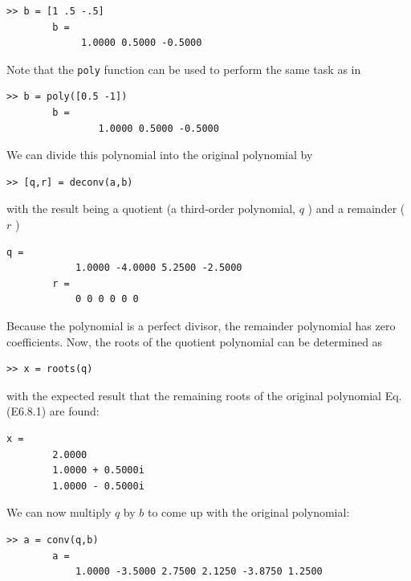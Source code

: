 \documentclass[../main.tex]{subfiles}
\begin{document}
\begin{example}
    \begin{lstlisting}[numbers=none,frame=none]
        >> b = [1 .5 -.5]
        b =
             1.0000 0.5000 -0.5000
	\end{lstlisting}


    \noindent Note that the \texttt{poly} function can be used to perform the same task as in

    \begin{lstlisting}[numbers=none,frame=none]
        >> b = poly([0.5 -1])
        b =
                1.0000 0.5000 -0.5000
	\end{lstlisting}

    \noindent We can divide this polynomial into the original polynomial by

    \begin{lstlisting}[numbers=none,frame=none]
            >> [q,r] = deconv(a,b)
	\end{lstlisting}

    \noindent with the result being a quotient (a third-order polynomial, $q$ ) and a remainder ( $r$ )

    \begin{lstlisting}[numbers=none,frame=none]
        q =
            1.0000 -4.0000 5.2500 -2.5000
        r =
            0 0 0 0 0 0
    \end{lstlisting}

    \noindent Because the polynomial is a perfect divisor, the remainder polynomial has zero coefficients. Now, the roots of the quotient polynomial can be determined as
    
    \begin{lstlisting}[numbers=none,frame=none]
        >> x = roots(q)
    \end{lstlisting}

    \noindent with the expected result that the remaining roots of the original polynomial Eq. (E6.8.1) are
    found:\\

    \begin{lstlisting}[numbers=none,frame=none]
        x =
        2.0000
        1.0000 + 0.5000i
        1.0000 - 0.5000i
    \end{lstlisting}

    \noindent We can now multiply $q$ by $b$ to come up with the original polynomial:

    \begin{lstlisting}[numbers=none,frame=none]
        >> a = conv(q,b)
        a =
            1.0000 -3.5000 2.7500 2.1250 -3.8750 1.2500
    \end{lstlisting}


\end{example}
\end{document}

